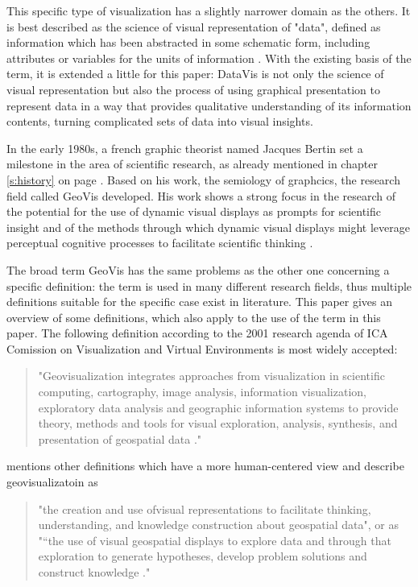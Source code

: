 \begin{enumerate}
This specific type of visualization has a slightly narrower domain as the others. It is best described as the science of visual representation of "data", defined as information which has been abstracted in some schematic form, including attributes or variables for the units of information .
With the existing basis of the term, it is extended a little for this paper: \ac{DataVis} is not only the science of visual representation but also the process of using graphical presentation to represent data in a way that provides qualitative understanding of its information contents, turning complicated sets of data into visual insights.

In the early 1980s, a french graphic theorist named Jacques Bertin set a milestone in the area of scientific research, as already mentioned in chapter \ref{s:history} on page \pageref{s:history}. Based on his work, the semiology of graphcics, the research field called \ac{GeoVis} developed. His work shows a strong focus in the research of the potential for the use of dynamic visual displays as prompts for scientific insight and of the methods through which dynamic visual displays might leverage perceptual cognitive processes to facilitate scientific thinking .

The broad term \ac{GeoVis} has the same problems as the other one concerning a specific definition: the term is used in many different research fields, thus multiple definitions suitable for the specific case exist in literature. This paper gives an overview of some definitions, which also apply to the use of the term in this paper.
The following definition according to the 2001 research agenda of \ac{ICA} Comission on Visualization and Virtual Environments is most widely accepted:
\begin{quote}
"Geovisualization integrates approaches from visualization in scientific computing, cartography, image analysis, information visualization, exploratory data analysis and geographic information systems to provide theory, methods and tools for visual exploration, analysis, synthesis, and presentation of geospatial data ."
\end{quote}

\citeauthor{Noellenburg2007} mentions other definitions which have a more human-centered view and describe geovisualizatoin as
\begin{quote}
"the creation and use ofvisual representations to facilitate thinking, understanding, and knowledge construction about geospatial data", or as "“the use of visual geospatial displays
to explore data and through that exploration to generate hypotheses, develop
problem solutions and construct knowledge ."
\end{quote}


\end{enumerate}
